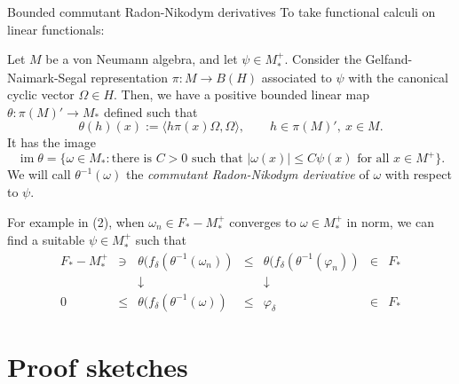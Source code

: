 \documentclass{../../../slide}
\begin{document}
\begin{frame}{Bounded commutant Radon-Nikodym derivatives}
To take functional calculi on linear functionals:
\pause
\begin{defn}
Let $M$ be a von Neumann algebra, and let $\psi\in M_*^+$.
Consider the Gelfand-Naimark-Segal representation $\pi:M\to B(H)$ associated to $\psi$ with the canonical cyclic vector $\Omega\in H$.
Then, we have a positive bounded linear map $\theta:\pi(M)'\to M_*$ defined such that
\[\theta(h)(x):=\langle h\pi(x)\Omega,\Omega\rangle,\qquad h\in\pi(M)',\ x\in M.\]
It has the image
\[\operatorname{im}\theta=\{\omega\in M_*:\text{there is $C>0$ such that $|\omega(x)|\le C\psi(x)$ for all $x\in M^+$}\}.\]
We will call $\theta^{-1}(\omega)$ the \emph{commutant Radon-Nikodym derivative} of $\omega$ with respect to $\psi$.
\end{defn}
\pause
For example in (2), when $\omega_n\in F_*-M_*^+$ converges to $\omega\in M_*^+$ in norm, we can find a suitable $\psi\in M_*^+$ such that
\[\begin{array}{ccccccc}
F_*-M_*^+ & \ni & \theta(f_\delta(\theta^{-1}(\omega_n)) & \le & \theta(f_\delta(\theta^{-1}(\varphi_n)) & \in & F_* \\
&& \downarrow && \downarrow &&\\
0 & \le & \theta(f_\delta(\theta^{-1}(\omega)) & \le & \varphi_\delta & \in & F_*
\end{array}\]
\end{frame}

\section{Proof sketches}
\contents
\end{document}
